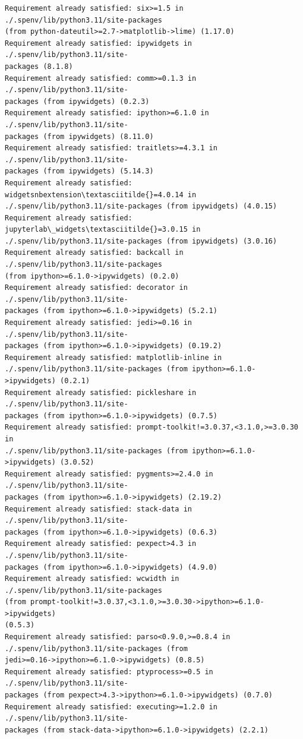 \documentclass[9pt]{article}
\begin{document}
\begin{Verbatim}[commandchars=\\\{\}]
Requirement already satisfied: six>=1.5 in ./.spenv/lib/python3.11/site-packages
(from python-dateutil>=2.7->matplotlib->lime) (1.17.0)
Requirement already satisfied: ipywidgets in ./.spenv/lib/python3.11/site-
packages (8.1.8)
Requirement already satisfied: comm>=0.1.3 in ./.spenv/lib/python3.11/site-
packages (from ipywidgets) (0.2.3)
Requirement already satisfied: ipython>=6.1.0 in ./.spenv/lib/python3.11/site-
packages (from ipywidgets) (8.11.0)
Requirement already satisfied: traitlets>=4.3.1 in ./.spenv/lib/python3.11/site-
packages (from ipywidgets) (5.14.3)
Requirement already satisfied: widgetsnbextension\textasciitilde{}=4.0.14 in
./.spenv/lib/python3.11/site-packages (from ipywidgets) (4.0.15)
Requirement already satisfied: jupyterlab\_widgets\textasciitilde{}=3.0.15 in
./.spenv/lib/python3.11/site-packages (from ipywidgets) (3.0.16)
Requirement already satisfied: backcall in ./.spenv/lib/python3.11/site-packages
(from ipython>=6.1.0->ipywidgets) (0.2.0)
Requirement already satisfied: decorator in ./.spenv/lib/python3.11/site-
packages (from ipython>=6.1.0->ipywidgets) (5.2.1)
Requirement already satisfied: jedi>=0.16 in ./.spenv/lib/python3.11/site-
packages (from ipython>=6.1.0->ipywidgets) (0.19.2)
Requirement already satisfied: matplotlib-inline in
./.spenv/lib/python3.11/site-packages (from ipython>=6.1.0->ipywidgets) (0.2.1)
Requirement already satisfied: pickleshare in ./.spenv/lib/python3.11/site-
packages (from ipython>=6.1.0->ipywidgets) (0.7.5)
Requirement already satisfied: prompt-toolkit!=3.0.37,<3.1.0,>=3.0.30 in
./.spenv/lib/python3.11/site-packages (from ipython>=6.1.0->ipywidgets) (3.0.52)
Requirement already satisfied: pygments>=2.4.0 in ./.spenv/lib/python3.11/site-
packages (from ipython>=6.1.0->ipywidgets) (2.19.2)
Requirement already satisfied: stack-data in ./.spenv/lib/python3.11/site-
packages (from ipython>=6.1.0->ipywidgets) (0.6.3)
Requirement already satisfied: pexpect>4.3 in ./.spenv/lib/python3.11/site-
packages (from ipython>=6.1.0->ipywidgets) (4.9.0)
Requirement already satisfied: wcwidth in ./.spenv/lib/python3.11/site-packages
(from prompt-toolkit!=3.0.37,<3.1.0,>=3.0.30->ipython>=6.1.0->ipywidgets)
(0.5.3)
Requirement already satisfied: parso<0.9.0,>=0.8.4 in
./.spenv/lib/python3.11/site-packages (from
jedi>=0.16->ipython>=6.1.0->ipywidgets) (0.8.5)
Requirement already satisfied: ptyprocess>=0.5 in ./.spenv/lib/python3.11/site-
packages (from pexpect>4.3->ipython>=6.1.0->ipywidgets) (0.7.0)
Requirement already satisfied: executing>=1.2.0 in ./.spenv/lib/python3.11/site-
packages (from stack-data->ipython>=6.1.0->ipywidgets) (2.2.1)

\end{Verbatim}
\end{document}
